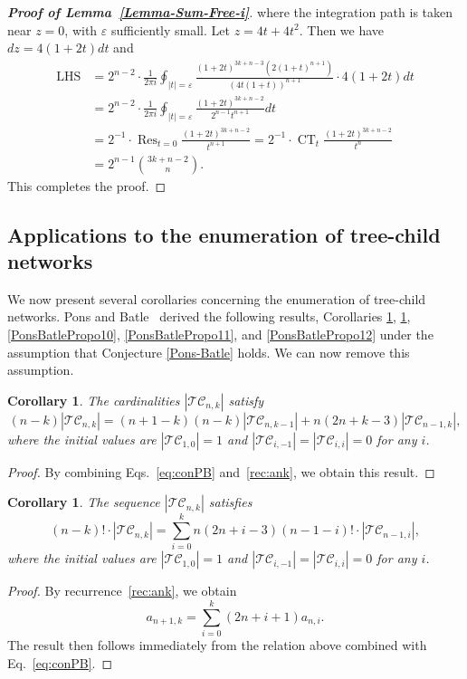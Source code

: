 \documentclass[reqno, 12pt]{article}
\newtheorem{cor}[thm]{Corollary}
\theoremstyle{mydefinition}
\theoremstyle{myremark}
\numberwithin{algorithm}{section}
\begin{document}
\begin{proof}[{\bf Proof of Lemma~\ref{Lemma-Sum-Free-i}}]
where the integration path is taken near $z=0$, with $\varepsilon$ sufficiently small.
Let $z=4t+4t^2$. Then we have $dz=4(1+2t)dt$ and
\begin{align*}
\mathrm{LHS} &= 2^{n-2}\cdot \frac{1}{2\pi i}\oint_{|t|=\varepsilon} \frac{(1+2t)^{3k+n-3}(2(1+t)^{n+1})}{(4t(1+t))^{n+1}} \cdot 4(1+2t) dt
\\&=2^{n-2}\cdot \frac{1}{2\pi i}\oint_{|t|=\varepsilon} \frac{(1+2t)^{3k+n-2}}{2^{n-1}t^{n+1}} dt
\\ &= 2^{-1}\cdot\mathop{\mathrm{Res}}_{t=0} \frac{(1+2t)^{3k+n-2}}{t^{n+1}}
=2^{-1}\cdot\mathop{\mathrm{CT}}_{t} \frac{(1+2t)^{3k+n-2}}{t^{n}}
\\ &= 2^{n-1}\binom{3k+n-2}{n}.
\end{align*}
This completes the proof.
\end{proof}




\subsection{Applications to the enumeration of tree-child networks}
\label{apps:thm1.1}

We now present several corollaries concerning the enumeration of tree-child networks.
Pons and Batle~\cite[Propositions 8-12]{PB} derived the following results, Corollaries \ref{PonsBatlePropo8}, \ref{PonsBatlePropo9}, \ref{PonsBatlePropo10}, \ref{PonsBatlePropo11}, and \ref{PonsBatlePropo12} under the assumption that Conjecture \ref{Pons-Batle} holds.
We can now remove this assumption.

\begin{cor}\label{PonsBatlePropo8}
The cardinalities $|\mathcal{TC}_{n,k}|$ satisfy
$$(n-k)|\mathcal{TC}_{n,k}|=(n+1-k)(n-k) |\mathcal{TC}_{n,k-1}|+n(2n+k-3) |\mathcal{TC}_{n-1,k}|,$$
where the initial values are $|\mathcal{TC}_{1,0}|=1$ and $|\mathcal{TC}_{i,-1}|=|\mathcal{TC}_{i,i}|=0$ for any $i$.
\end{cor}
\begin{proof}
By combining Eqs.~\eqref{eq:conPB} and~\eqref{rec:ank}, we obtain this result.
\end{proof}


\begin{cor}\label{PonsBatlePropo9}
The sequence $|\mathcal{TC}_{n,k}|$ satisfies
$$(n-k)!\cdot |\mathcal{TC}_{n,k}|=\sum_{i=0}^k n(2n+i-3)(n-1-i)!\cdot |\mathcal{TC}_{n-1,i}|,$$
where the initial values are $|\mathcal{TC}_{1,0}|=1$ and $|\mathcal{TC}_{i,-1}|=|\mathcal{TC}_{i,i}|=0$ for any $i$.
\end{cor}
\begin{proof}
By recurrence~\eqref{rec:ank}, we obtain
$$a_{n+1,k}=\sum_{i=0}^k (2n+i+1)a_{n,i}.$$
The result then follows immediately from the relation above combined with Eq.~\eqref{eq:conPB}.
\end{proof}
\end{document}
